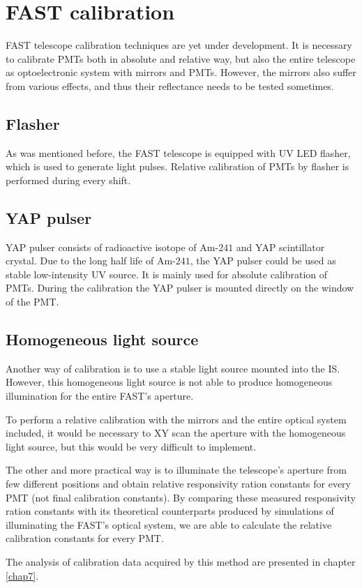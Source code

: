 \section{FAST calibration}
FAST telescope calibration techniques are yet under development. It is necessary to calibrate PMTs both in absolute and relative way, but also the entire telescope as optoelectronic system with mirrors and PMTs. However, the mirrors also suffer from various effects, and thus their reflectance needs to be tested sometimes.
\subsection{Flasher}
As was mentioned before, the FAST telescope is equipped with UV LED flasher, which is used to generate light pulses. Relative calibration of PMTs by flasher is performed during every shift.
\subsection{YAP pulser}
YAP pulser consists of radioactive isotope of $\textrm{Am-241}$ and YAP scintillator crystal. Due to the long half life of $\textrm{Am-241}$, the YAP pulser could be used as stable low-intensity UV source. 
It is mainly used for absolute calibration of PMTs. During the calibration the YAP pulser is mounted directly on the window of the PMT.

\subsection{Homogeneous light source}
Another way of calibration is to use a stable light source mounted into the IS. However, this homogeneous light source is not able to produce homogeneous illumination for the entire FAST's aperture.  
\par
To perform a relative calibration with the mirrors and the entire optical system included, it would be necessary to XY scan the aperture with the homogeneous light source, but this would be very difficult to implement.   

\par
The other and more practical way is to illuminate the telescope's aperture from few different positions and obtain relative responsivity ration constants for every PMT (not final calibration constants). By comparing these measured responsivity ration constants with its theoretical counterparts produced by simulations of illuminating the FAST's optical system, we are able to calculate the relative calibration constants for every PMT.       
\par
The analysis of calibration data acquired by this method are presented in chapter \ref{chap7}.

